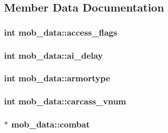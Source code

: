 \subsection{Member Data Documentation}
\hypertarget{structmob__data_adc1eb40f9106426531703413f3640837}{
\subsubsection[{access\-\_\-flags}]{\setlength{\rightskip}{0pt plus 5cm}int mob\-\_\-data\-::access\-\_\-flags}}\label{structmob__data_adc1eb40f9106426531703413f3640837}
\hypertarget{structmob__data_a8be7bdb4c9a2c2d99c6cb90cada65bcf}{
\subsubsection[{ai\-\_\-delay}]{\setlength{\rightskip}{0pt plus 5cm}int mob\-\_\-data\-::ai\-\_\-delay}}\label{structmob__data_a8be7bdb4c9a2c2d99c6cb90cada65bcf}
\hypertarget{structmob__data_a48f53ae8473244cec6f713910a550263}{
\subsubsection[{armortype}]{\setlength{\rightskip}{0pt plus 5cm}int mob\-\_\-data\-::armortype}}\label{structmob__data_a48f53ae8473244cec6f713910a550263}
\hypertarget{structmob__data_a3e43c21ad25dc948d46ab4116a0eb0f8}{
\subsubsection[{carcass\-\_\-vnum}]{\setlength{\rightskip}{0pt plus 5cm}int mob\-\_\-data\-::carcass\-\_\-vnum}}\label{structmob__data_a3e43c21ad25dc948d46ab4116a0eb0f8}
\hypertarget{structmob__data_a48a2f2ddfa6d865ff34602f8aa1d52e6}{
\subsubsection[{combat}]{$\ast$ mob\-\_\-data\-::combat}}\label{structmob__data_a48a2f2ddfa6d865ff34602f8aa1d52e6}
